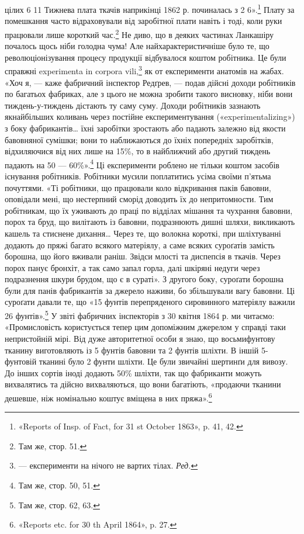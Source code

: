 \parcont{}  %
цілих 6 11 Тижнева плата ткачів наприкінці
1862 р. починалась з 2 6».\footnote{
«Reports of Insp. of Fact, for 31 st October 1863», p. 41, 42.
} Плату за помешкання
часто відраховували від заробітної плати навіть і тоді, коли
руки працювали лише короткий час.\footnote{
Там же, стор. 51.
} Не диво, що в деяких
частинах Ланкашіру почалось щось ніби голодна чума! Але найхарактеристичніше
було те, що революціонізування процесу продукції
відбувалося коштом робітника. Це були справжні experimenta
in corpora vili,\footnote*{
— експерименти на нічого не вартих тілах. \emph{Ред.}
} як от експерименти анатомів на жабах.
«Хоч я, — каже фабричний інспектор Редґрев, — подав дійсні
доходи робітників по багатьох фабриках, але з цього не можна
зробити такого висновку, ніби вони тиждень-у-тиждень дістають
ту саму суму. Доходи робітників зазнають якнайбільших
коливань через постійне експериментування («experimentalizing»)
з боку фабрикантів\dots{} їхні заробітки зростають або падають залежно
від якости бавовняної сумішки; вони то наближаються
до їхніх попередніх заробітків, відхиляючися від них лише на
15\%, то в найближчий або другий тиждень падають на 50 —
60\%».\footnote{
Там же, стор. 50, 51.
} Ці експерименти роблено не тільки коштом засобів
існування робітників. Робітники мусили поплатитись усіма своїми
п’ятьма почуттями. «Ті робітники, що працювали коло відкривання
паків бавовни, оповідали мені, що нестерпний сморід
доводить їх до непритомности. Тим робітникам, що їх уживають
до праці по відділах мішання та чухрання бавовни, порох та бруд,
що вилітають із бавовни, подразнюють дишні шляхи, викликають
кашель та стиснене дихання\dots{} Через те, що волокна короткі,
при шліхтуванні додають до пряжі багато всякого матеріялу, а
саме всяких суроґатів замість борошна, що його вживали раніш.
Звідси млості та диспепсія в ткачів. Через порох панує бронхіт,
а так само запал горла, далі шкіряні недуги через подразнення
шкури брудом, що є в сураті». З другого боку, суроґати борошна
були для панів фабрикантів за джерело наживи, бо збільшували
вагу бавовни. Ці суроґати давали те, що «15 фунтів перепряденого
сировинного матеріялу важили 26 фунтів».\footnote{
Там же, стор. 62, 63.
} У звіті фабричних
інспекторів з 30 квітня 1864 р. ми читаємо: «Промисловість
користується тепер цим допоміжним джерелом у справді таки
непристойній мірі. Від дуже авторитетної особи я знаю, що восьмифунтову
тканину виготовляють із 5 фунтів бавовни та 2 фунтів
шліхти. В іншій 5-фунтовій тканині було 2 фунти шліхти.
Це були звичайні шертинґи для вивозу. До інших сортів іноді
додають 50\% шліхти, так що фабриканти можуть вихвалятись
та дійсно вихваляються, що вони багатіють, «продаючи тканини
дешевше, ніж номінально коштує вміщена в них пряжа».\footnote{
«Reports etc. for 30 th April 1864», p. 27.
}
\parbreak{}  %
